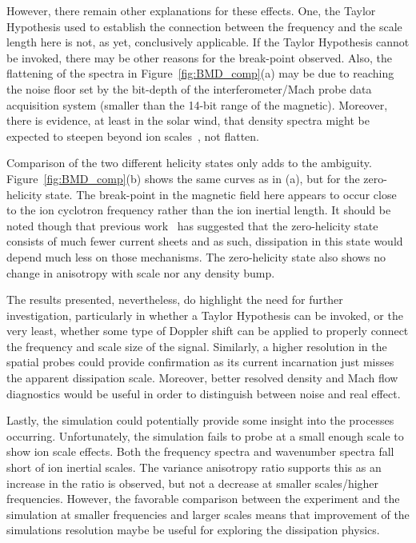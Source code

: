 \documentclass[aip,prl,amsmath,amssymb,reprint,superscriptaddress]{revtex4-1} %
\begin{document}
However, there remain other explanations for these effects. One, the Taylor Hypothesis used to establish the connection between the frequency and the scale length here is not, as yet, conclusively applicable. If the Taylor Hypothesis cannot be invoked, there may be other reasons for the break-point observed. Also, the flattening of the spectra in Figure~\ref{fig:BMD_comp}(a) may be due to reaching the noise floor set by the bit-depth of the interferometer/Mach probe data acquisition system (smaller than the 14-bit range of the magnetic). Moreover, there is evidence, at least in the solar wind, that density spectra might be expected to steepen beyond ion scales~\cite{chen12}, not flatten.

Comparison of the two different helicity states only adds to the ambiguity. Figure~\ref{fig:BMD_comp}(b) shows the same curves as in (a), but for the zero-helicity state. The break-point in the magnetic field here appears to occur close to the ion cyclotron frequency rather than the ion inertial length. It should be noted though that previous work~\cite{schaffner14b} has suggested that the zero-helicity state consists of much fewer current sheets and as such, dissipation in this state would depend much less on those mechanisms. The zero-helicity state also shows no change in anisotropy with scale nor any density bump.

The results presented, nevertheless, do highlight the need for further investigation, particularly in whether a Taylor Hypothesis can be invoked, or the very least, whether some type of Doppler shift can be applied to properly connect the frequency and scale size of the signal. Similarly, a higher resolution in the spatial probes could provide confirmation as its current incarnation just misses the apparent dissipation scale. Moreover, better resolved density and Mach flow diagnostics would be useful in order to distinguish between noise and real effect.

Lastly, the simulation could potentially provide some insight into the processes occurring. Unfortunately, the simulation fails to probe at a small enough scale to show ion scale effects. Both the frequency spectra and wavenumber spectra fall short of ion inertial scales. The variance anisotropy ratio supports this as an increase in the ratio is observed, but not a decrease at smaller scales/higher frequencies. However, the favorable comparison between the experiment and the simulation at smaller frequencies and larger scales means that improvement of the simulations resolution maybe be useful for exploring the dissipation physics.
\end{document}
